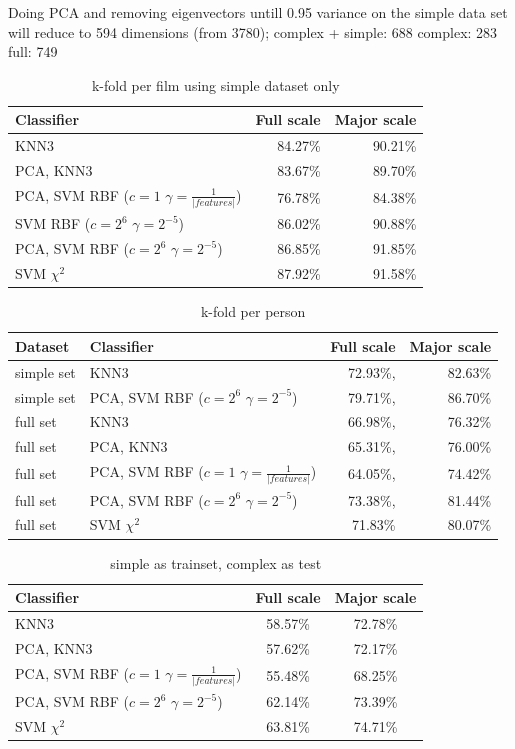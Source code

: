 Doing PCA and removing eigenvectors untill 0.95 variance on the simple data set will reduce to  594 dimensions (from 3780);
complex + simple: 688
complex:  283
full: 749


\begin{table}
\centering
\begin{tabular}{lrr}
\hline\hline
Classifier 				&  	Full scale	& Major scale	\\
\hline
KNN3 		&  	84.27\%		& 90.21\%		\\
PCA, KNN3 	& 	83.67\%		& 89.70\%		\\
PCA, SVM RBF ($c=1$ $\gamma=\frac{1}{|features|}$)	& 	76.78\%		& 84.38\%		\\
SVM RBF ($c=2^6$ $\gamma=2^{-5}$) & 86.02\% & 90.88\% \\
PCA, SVM RBF ($c=2^6$ $\gamma=2^{-5}$) &  86.85\% & 91.85\% \\
SVM $\chi^2$ & 87.92\% 		& 91.58\% \\
\hline
\end{tabular}
\caption{k-fold per film using simple dataset only}
\end{table}


\begin{table}
\centering
\begin{tabular}{llrr}
\hline\hline
Dataset & Classifier 				&  	Full scale	& Major scale	\\
\hline
simple set	& KNN3	& 72.93\%, & 82.63\%	\\
simple set	& PCA, SVM RBF ($c=2^6$ $\gamma=2^{-5}$) & 79.71\%, & 86.70\%	\\
full set	& KNN3 & 66.98\%, & 76.32\%	\\
full set	& PCA, KNN3 & 65.31\%, & 76.00\%	\\
full set	& PCA, SVM RBF ($c=1$ $\gamma=\frac{1}{|features|}$) & 64.05\%, & 74.42\%	\\
full set	& PCA, SVM RBF ($c=2^6$ $\gamma=2^{-5}$)& 73.38\%, & 81.44\%	\\
full set    & SVM $\chi^2$ &  71.83\% &80.07\% \\
\hline
\end{tabular}
\caption{k-fold per person}
\end{table}


\begin{table}
\centering
\begin{tabular}{lcc}
\hline\hline
Classifier 				&  	Full scale	&	Major scale	\\
\hline
KNN3					&	58.57\% 	&	72.78\%	\\
PCA, KNN3 				&	57.62\% 	&	72.17\%	\\
PCA, SVM RBF ($c=1$ $\gamma=\frac{1}{|features|}$)	& 55.48\%	&	68.25\%	\\
PCA, SVM RBF ($c=2^6$ $\gamma=2^{-5}$)				& 62.14\%	&	73.39\%	\\
SVM $\chi^2$ 			&	63.81\%		&	74.71\%	\\
\hline
\end{tabular}
\caption{simple as trainset, complex as test}
\end{table}



